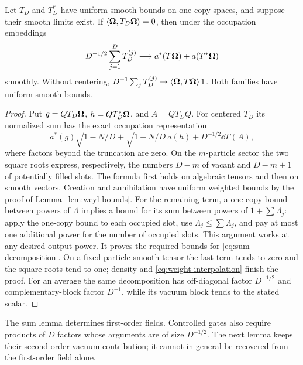 \begin{lemma}[Sums]\label{lem:centered-sums}
Let $T_D$ and $T_D^*$ have uniform smooth bounds on one-copy
spaces, and suppose their smooth limits exist.  If
$\langle \boldsymbol\Omega,T_D\boldsymbol\Omega\rangle=0$, then under the occupation embeddings
\begin{equation}\label{eq:centered-sum-limit}
 D^{-1/2}\sum_{j=1}^D T_D^{(j)}
 \longrightarrow a^*(T\boldsymbol\Omega)+a(T^*\boldsymbol\Omega)
\end{equation}
smoothly.  Without centering,
$D^{-1}\sum_jT_D^{(j)}\to\langle \boldsymbol\Omega,T\boldsymbol\Omega\rangle\,1$.
Both families have uniform smooth bounds.
\end{lemma}

\begin{proof}
Put $g=QT_D\boldsymbol\Omega$, $h=QT_D^*\boldsymbol\Omega$, and $A=QT_DQ$.
For centered $T_D$ its normalized sum has the exact occupation
representation
\begin{equation}\label{eq:sum-decomposition}
 a^*(g)\sqrt{1-N/D}
 +\sqrt{1-N/D}\,a(h)+D^{-1/2}\dd\Gamma(A),
\end{equation}
where factors beyond the truncation are zero.  On the $m$-particle
sector the two square roots express, respectively, the numbers
$D-m$ of vacant and $D-m+1$ of potentially filled slots.
The formula first holds on algebraic tensors and then on smooth
vectors.  Creation and annihilation have uniform weighted bounds
by the proof of Lemma~\ref{lem:weyl-bounds}.  For the remaining
term, a one-copy bound between powers of $\Lambda$ implies a bound
for its sum between powers of $1+\sum\Lambda_j$: apply the
one-copy bound to each occupied slot, use
$\Lambda_j\leq\sum\Lambda_j$, and pay at most one additional
power for the number of occupied slots.  This argument works at
any desired output power.  It proves the required bounds for
\eqref{eq:sum-decomposition}.  On a fixed-particle smooth tensor
the last term tends to zero and the square roots tend to one;
density and \eqref{eq:weight-interpolation} finish the proof.
For an average the same decomposition has off-diagonal factor
$D^{-1/2}$ and complementary-block factor $D^{-1}$, while its
vacuum block tends to the stated scalar.
\end{proof}

The sum lemma determines first-order fields.  Controlled gates also
require products of $D$ factors whose arguments are of size
$D^{-1/2}$.  The next lemma keeps their second-order vacuum contribution;
it cannot in general be recovered from the first-order field alone.

